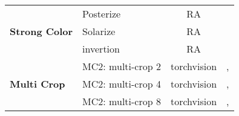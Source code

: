 \documentclass[times,twocolumn,final]{elsarticle}
\begin{document}
\begin{table}[ht!]
\begin{tabular}{llcc}
    \multirow{3}{*}{\textbf{Strong Color}} & Posterize         & RA              &               \\
                                           & Solarize          & RA              &               \\
                                           & invertion         & RA              &               \\\midrule
    \multirow{3}{*}{\textbf{Multi Crop}}   & MC2: multi-crop 2 & torchvision     & ,             \\
                                           & MC2: multi-crop 4 & torchvision     & ,  \\
                                           & MC2: multi-crop 8 & torchvision     & ,  \\
    \bottomrule
  \end{tabular}
\end{table}
\end{document}

